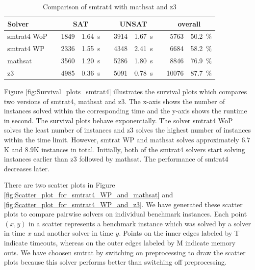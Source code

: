 \begin{table}[!ht]
    \caption{Comparison of smtrat4 with mathsat and z3}    
    \begin{tabularx}{\textwidth}{lXrrXrrXrr}
	\toprule
	\textbf{Solver}
	&& \multicolumn{2}{c}{\textbf{SAT}}
	&& \multicolumn{2}{c}{\textbf{UNSAT}}
	&& \multicolumn{2}{c}{\textbf{overall}}
	\\
	\midrule
	smtrat4 WoP
	&& 1849 & 1.64~s
	&& 3914 & 1.67~s
	&& 5763 & 50.2~\%
	\\
	smtrat4 WP
	&& 2336 & 1.55~s
	&& 4348 & 2.41~s
	&& 6684 & 58.2~\%
	\\
	mathsat
    	&& 3560 & 1.20~s
     	&& 5286 & 1.80~s
     	&& 8846 & 76.9~\%
	\\
	z3
	&& 4985 & 0.36~s
	&& 5091 & 0.78~s
	&& 10076 & 87.7~\%
	\\
	\bottomrule
\end{tabularx}
    \label{table:smtrat4_vs_mathsatAndZ3}
\end{table}

\noindent Figure \ref{fig:Survival_plots_smtrat4} illustrates the survival plots which compares two versions of smtrat4, mathsat and z3.
The x-axis shows the number of instances solved within the corresponding time and the y-axis shows the runtime in second.
The survival plots behave exponentially.
The solver smtrat4 WoP solves the least number of instances and z3 solves the highest number of instances within the time limit.
However, smtrat WP and mathsat solves approximately $6.7$K and $8.9$K instances in total.
Initially, both of the smtrat4 solvers start solving instances earlier than z3 followed by mathsat.
The performance of smtrat4 decreases later.\newline

\noindent There are two scatter plots in Figure \ref{fig:Scatter_plot_for_smtrat4_WP_and_mathsat} and \ref{fig:Scatter_plot_for_smtrat4_WP_and_z3}.
We have generated these scatter plots to compare pairwise solvers on individual benchmark instances.
Each point $(x, y)$ in a scatter represents a benchmark instance which was solved by a solver in time $x$ and another solver in time $y$.
Points on the inner edges labeled by T indicate timeouts, whereas on the outer edges labeled by M indicate memory outs.
We have choosen smtrat by switching on preprocessing to draw the scatter plots because this solver performs better than switching off preprocessing.\newline

